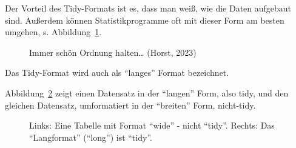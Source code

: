 \documentclass[
  a4paper,
]{scrbook}
\theoremstyle{definition}
\theoremstyle{definition}
\theoremstyle{definition}
\theoremstyle{remark}
\begin{document}
Der Vorteil des Tidy-Formats ist es, dass man weiß, wie die Daten
aufgebaut sind. Außerdem können Statistikprogramme oft mit dieser Form
am besten umgehen, s. Abbildung~\ref{fig-tidy3}.

\begin{figure}


\caption{\label{fig-tidy3}Immer schön Ordnung halten\ldots{} (Horst,
2023)}

\end{figure}%

Das Tidy-Format wird auch als ``langes'' Format bezeichnet.

Abbildung~\ref{fig-long-wide-anim} zeigt einen Datensatz in der
``langen'' Form, also tidy, und den gleichen Datensatz, umformatiert in
der ``breiten'' Form, nicht-tidy.

\begin{figure}


\caption{\label{fig-long-wide-anim}Links: Eine Tabelle mit Format
``wide'' - nicht ``tidy''. Rechts: Das ``Langformat'' (``long'') ist
``tidy''.}

\end{figure}%
\end{document}
